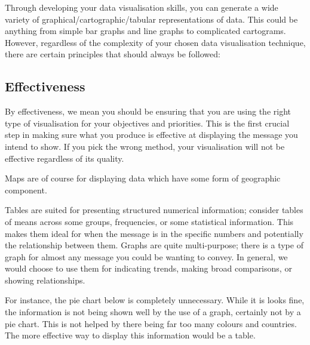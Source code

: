 \documentclass[
]{book}
\begin{document}
Through developing your data visualisation skills, you can generate a wide variety of graphical/cartographic/tabular representations of data. This could be anything from simple bar graphs and line graphs to complicated cartograms. However, regardless of the complexity of your chosen data visualisation technique, there are certain principles that should always be followed:

\hypertarget{effectiveness}{%
\subsection{Effectiveness}\label{effectiveness}}

By effectiveness, we mean you should be ensuring that you are using the right type of visualisation for your objectives and priorities. This is the first crucial step in making sure what you produce is effective at displaying the message you intend to show. If you pick the wrong method, your visualisation will not be effective regardless of its quality.

Maps are of course for displaying data which have some form of geographic component.

Tables are suited for presenting structured numerical information; consider tables of means across some groups, frequencies, or some statistical information. This makes them ideal for when the message is in the specific numbers and potentially the relationship between them.
Graphs are quite multi-purpose; there is a type of graph for almost any message you could be wanting to convey. In general, we would choose to use them for indicating trends, making broad comparisons, or showing relationships.

For instance, the pie chart below is completely unnecessary. While it is looks fine, the information is not being shown well by the use of a graph, certainly not by a pie chart. This is not helped by there being far too many colours and countries. The more effective way to display this information would be a table.
\end{document}
